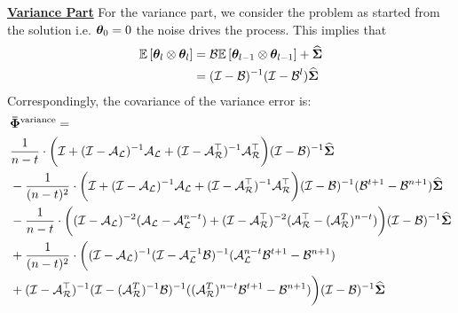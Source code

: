 \underline{\bf Variance Part}
For the variance part, we consider the problem as started from the solution i.e. $\thetav_0=0$ the noise drives the process. This implies that
\begin{align*} \E{\thetav_l\otimes\thetav_l}&=\B\E{\thetav_{l-1}\otimes\thetav_{l-1}}+\Sigh\nonumber\\
&=(\eyeT-\BT)^{-1}(\eyeT-\B^l)\Sigh
\end{align*}
Correspondingly, the covariance of the variance error is:
\begin{align*}
&\phivb^{\text{variance}}=\\
&\frac{1}{n-t}\cdot\bigg(\eyeT+(\eyeT-\AL)^{-1}\AL+(\eyeT-\AR\T)^{-1}\AR\T\bigg)(\eyeT-\BT)^{-1}\Sigh\nonumber\\
&-\frac{1}{(n-t)^2}\cdot\bigg(\eyeT+(\eyeT-\AL)^{-1}\AL+(\eyeT-\AR\T)^{-1}\AR\T\bigg)(\eyeT-\BT)^{-1}(\BT^{t+1}-\BT^{n+1})\Sigh\nonumber\\
&-\frac{1}{n-t}\cdot\bigg((\eyeT-\AL)^{-2}(\AL-\AL^{n-t})+(\eyeT-\AR\T)^{-2}(\AR\T-(\AR^T)^{n-t})\bigg)(\eyeT-\BT)^{-1}\Sigh\nonumber\\
&+\frac{1}{(n-t)^2}\cdot\bigg( (\eyeT-\AL)^{-1}(\eyeT-\AL^{-1}\BT)^{-1}(\AL^{n-t}\BT^{t+1}-\BT^{n+1}) \nonumber\\&+ (\eyeT-\AR\T)^{-1}(\eyeT-(\AR^T)^{-1}\BT)^{-1}((\AR^T)^{n-t}\BT^{t+1}-\BT^{n+1}) \bigg)(\eyeT-\BT)^{-1}\Sigh
\end{align*}
\fi